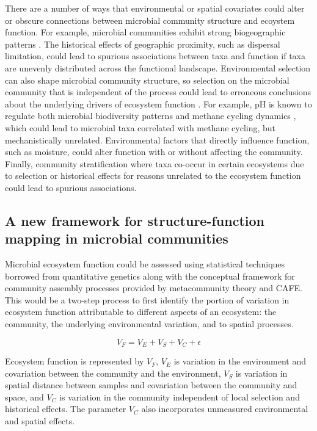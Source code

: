 \documentclass{article}
\begin{document}
There are a number of ways that environmental or spatial covariates could alter
or obscure connections between microbial community structure and ecoystem
function. For example, microbial communities exhibit strong biogeographic
patterns \citep{martiny2006}. The historical effects of geographic proximity,
such as dispersal limitation, could lead to spurious associations between taxa
and function if taxa are unevenly distributed across the functional landscape.
Environmental selection can also shape microbial community structure, so
selection on the microbial community that is independent of the
process could lead to erroneous conclusions about the
underlying drivers of ecosystem function \citep{thompson2017}. For
example, pH is known to regulate both microbial biodiversity patterns
\citep{fierer2006} and methane cycling dynamics \citep{ye2012}, which could lead
to microbial taxa correlated with methane cycling, but mechanistically
unrelated. Environmental factors that directly influence function, such as
moisture, could alter function with or without affecting the community. 
Finally, community stratification where taxa co-occur in certain ecosystems due to
selection or historical effects for reasons unrelated to the ecosystem function
could lead to spurious associations.

\subsection{A new framework for structure-function mapping in microbial
communities}

Microbial ecosystem function could be assessed using statistical techniques
borrowed from quantitative genetics along with the conceptual framework for
community assembly processes provided by metacommunity theory and CAFE. This
would be a two-step process to first identify the portion of variation in
ecosystem function attributable to different aspects of an ecosystem: the
community, the underlying environmental variation, and to spatial processes.

\begin{equation}
V_F=V_E+V_S+V_C+\epsilon
\end{equation}

Ecosystem function is represented by $V_F$, $V_E$ is variation in the
environment and covariation between the community and the environment, $V_S$ is
variation in spatial distance between samples and covariation between the
community and space, and $V_C$ is variation in the community independent of
local selection and historical effects. The parameter $V_C$ also incorporates
unmeasured environmental and spatial effects. 
\end{document}
